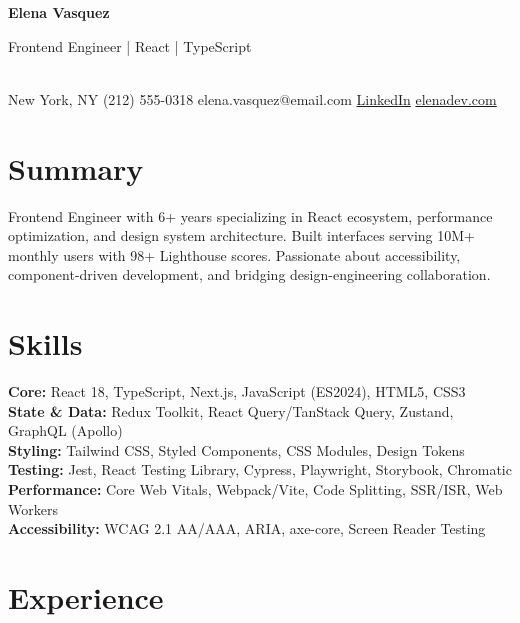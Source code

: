 \documentclass[10pt,a4paper]{article}
\begin{document}
\noindent\colorbox{primary}{\parbox{0.5\textwidth}{\vspace{6pt}\color{white}\bfseries\large\quad Elena Vasquez\vspace{6pt}}}%
\colorbox{secondary}{\parbox{0.485\textwidth}{\vspace{6pt}\color{white}\small\quad Frontend Engineer | React | TypeScript\vspace{6pt}}}\\[4pt]
{\small New York, NY \quad\textbar\quad (212) 555-0318 \quad\textbar\quad elena.vasquez@email.com \quad\textbar\quad \href{https://linkedin.com/in/elenavasquez}{\color{primary}LinkedIn} \quad\textbar\quad \href{https://elenadev.com}{\color{primary}elenadev.com}}

\vspace{4pt}

\section{Summary}
Frontend Engineer with 6+ years specializing in React ecosystem, performance optimization, and design system architecture. Built interfaces serving 10M+ monthly users with 98+ Lighthouse scores. Passionate about accessibility, component-driven development, and bridging design-engineering collaboration.

\section{Skills}
\textbf{Core:} React 18, TypeScript, Next.js, JavaScript (ES2024), HTML5, CSS3\\
\textbf{State \& Data:} Redux Toolkit, React Query/TanStack Query, Zustand, GraphQL (Apollo)\\
\textbf{Styling:} Tailwind CSS, Styled Components, CSS Modules, Design Tokens\\
\textbf{Testing:} Jest, React Testing Library, Cypress, Playwright, Storybook, Chromatic\\
\textbf{Performance:} Core Web Vitals, Webpack/Vite, Code Splitting, SSR/ISR, Web Workers\\
\textbf{Accessibility:} WCAG 2.1 AA/AAA, ARIA, axe-core, Screen Reader Testing

\section{Experience}
\end{document}
